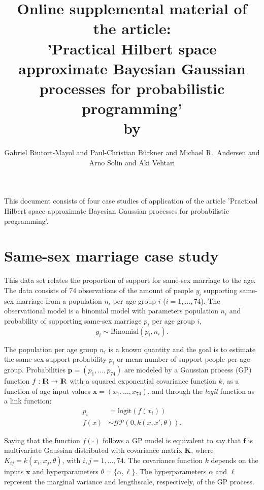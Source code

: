 \documentclass[onecolumn,a4paper,11pt]{article}
\title{Online supplemental material of the article:\\ \vspace{7mm} 'Practical Hilbert space approximate Bayesian Gaussian processes for probabilistic programming'\\ \vspace{7mm}
\normalsize by}
\author{Gabriel Riutort-Mayol and Paul-Christian Bürkner and Michael R.\ Andersen and\\
  Arno Solin and Aki Vehtari}
\date{}
\begin{document}
\maketitle

This document consists of four case studies of application of the article 'Practical Hilbert space approximate Bayesian Gaussian processes for probabilistic programming'.

\tableofcontents

\appendix


\section{Same-sex marriage case study}\label{ch5_sec_studycaseII}
This data set relates the proportion of support for same-sex marriage to the age. The data consists of 74 observations of the amount of people $y_i$ supporting same-sex marriage from a population $n_i$ per age group $i$ ($i=1,\dots,74$). The observational model is a binomial model with parameters population $n_i$ and probability of supporting same-sex marriage $p_i$ per age group $i$,
%
\begin{equation*}
y_i \sim \mathrm{Binomial}(p_i, n_i).
\end{equation*}

\noindent The population per age group $n_i$ is a known quantity and the goal is to estimate the same-sex support probability $p_i$ or mean number of support people per age group. Probabilities $\bm{p}=(p_1,\dots,p_{74})$ are modeled by a Gaussian process (GP) function $f:{\rm I\!R} \to {\rm I\!R}$ with a squared exponential covariance function $k$, as a function of age input values $\bm{x}=(x_1,\dots,x_{74})$, and through the {\it logit} function as a link function:
%
\begin{align*} \label{ch5_eq_gpprior_gay}
p_i &= \mathrm{logit}(f(x_i)) \nonumber \\
f(x) &\sim \mathcal{GP}(0, k(x,x', \theta)).
\end{align*}

\noindent Saying that the function $f(\cdot)$ follows a GP model is equivalent to say that $\bm{f}$ is multivariate Gaussian distributed with covariance matrix $\bm{K}$, where $K_{ij}=k(x_i,x_j,\theta)$, with $i,j=1,\dots,74$. The covariance function $k$ depends on the inputs $\bm{x}$ and hyperparameters $\theta=\{\alpha,\ell\}$. The hyperparameters $\alpha$ and $\ell$ represent the marginal variance and lengthscale, respectively, of the GP process.
\end{document}
